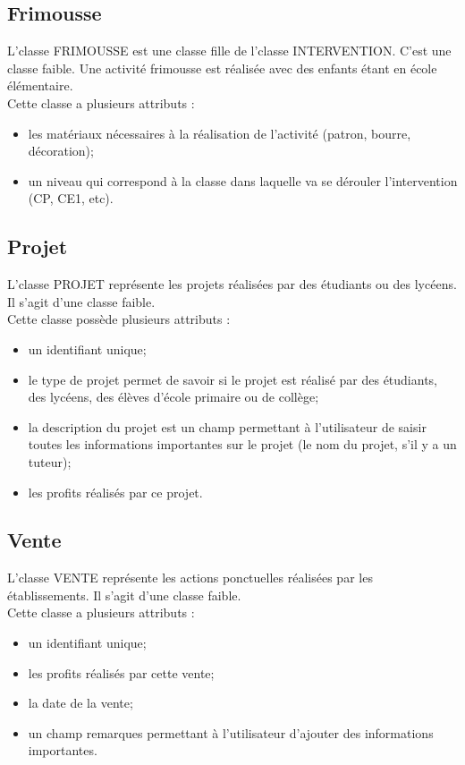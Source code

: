 \documentclass[asi, sansVersion]{picInsa}
\begin{document}
\subsection*{Frimousse}
L'classe FRIMOUSSE est une classe fille de l'classe INTERVENTION. C'est une classe faible. Une activité frimousse est réalisée avec des enfants étant en école élémentaire. \\
Cette classe a plusieurs attributs :
\begin{itemize}
\item les matériaux nécessaires à la réalisation de l'activité (patron, bourre, décoration); %
\item un niveau qui correspond à la classe dans laquelle va se dérouler l'intervention (CP, CE1, etc).
\end{itemize}

\subsection*{Projet}
L'classe PROJET représente les projets réalisées par des étudiants ou des lycéens. Il s'agit d'une classe faible.\\
Cette classe possède plusieurs attributs : 
\begin{itemize}
\item un identifiant unique;
\item  le type de projet permet de savoir si le projet est réalisé par des étudiants, des lycéens, des élèves d'école primaire ou de collège; 
\item la description du projet est un champ permettant à l'utilisateur de saisir toutes les informations importantes sur le projet (le nom du projet, s'il y a un tuteur);
\item les profits réalisés par ce projet.
\end{itemize}

\subsection*{Vente}
L'classe VENTE représente les actions ponctuelles réalisées par les établissements. Il s'agit d'une classe faible.\\ 
Cette classe a plusieurs attributs : 
\begin{itemize}
\item un identifiant unique; 
\item les profits réalisés par cette vente;
\item la date de la vente;
\item un champ remarques permettant à l'utilisateur d'ajouter des informations importantes. 
\end{itemize}
\end{document}
